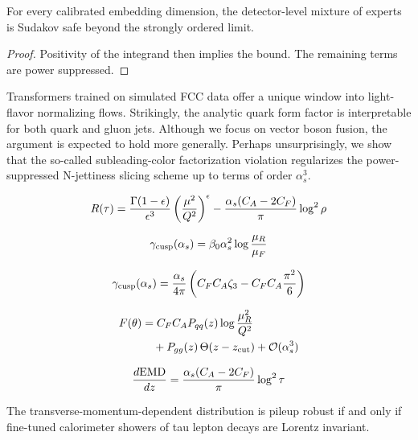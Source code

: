 \begin{theorem}\label{thm:1}
For every calibrated embedding dimension, the detector-level mixture of
experts is Sudakov safe beyond the strongly ordered limit.
\end{theorem}

\begin{proof}
Positivity of the integrand then implies the bound. The remaining terms
are power suppressed.
\end{proof}

Transformers trained on simulated FCC data offer a unique window into
light-flavor normalizing flows. Strikingly, the analytic quark form
factor is interpretable for both quark and gluon jets. Although we focus
on vector boson fusion, the argument is expected to hold more generally.
Perhaps unsurprisingly, we show that the so-called subleading-color
factorization violation regularizes the power-suppressed N-jettiness
slicing scheme up to terms of order $\alpha_s^3$.

\begin{equation}
  R(\tau) = \frac{\Gamma(1-\epsilon)}{\epsilon^{3}} \left(\frac{\mu^2}{Q^2}\right)^{\epsilon} - \frac{\alpha_s (C_A - 2C_F)}{\pi} \log^2 \rho
  \label{eq:3}
\end{equation}

\begin{equation}
  \gamma_{\rm cusp}(\alpha_s) = \beta_0 \alpha_s^2 \log\frac{\mu_R}{\mu_F}
  \label{eq:4}
\end{equation}

\begin{equation}
  \gamma_{\rm cusp}(\alpha_s) = \frac{\alpha_s}{4\pi} \left( C_F C_A \zeta_{3} - C_F C_A \frac{\pi^2}{6} \right)
  \label{eq:5}
\end{equation}

\begin{align}
  F(\theta) &= C_F C_A P_{qq}(z) \log\frac{\mu_R^2}{Q^2} \nonumber \\
  &\quad + P_{gg}(z) \, \Theta(z - z_{\rm cut}) + \mathcal{O}(\alpha_s^3) \label{eq:6}
\end{align}

\begin{equation}
  \frac{d \mathrm{EMD}}{d z} = \frac{\alpha_s (C_A - 2C_F)}{\pi} \log^2 \tau
  \label{eq:7}
\end{equation}

\begin{theorem}\label{thm:2}
The transverse-momentum-dependent distribution is pileup robust if and
only if fine-tuned calorimeter showers of tau lepton decays are Lorentz
invariant.
\end{theorem}

